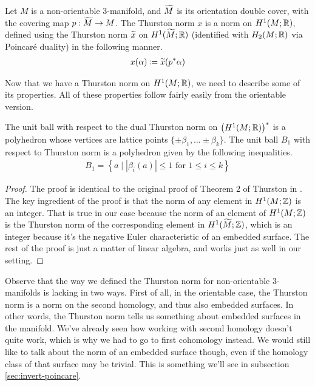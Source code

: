 \begin{defn}
  Let $M$ is a non-orientable $3$-manifold, and $\widetilde{M}$ is its orientation double cover, with the covering
  map $p: \widetilde{M} \to M$. The Thurston norm $x$ is a norm on $H^1(M; \mathbb{R})$, defined using the Thurston norm $\widetilde{x}$
  on $H^1(\widetilde{M}; \mathbb{R})$ (identified with $H_2(M; \mathbb{R})$ via Poincar\'e duality) in the following manner.
  \begin{align*}
    x(\alpha) \coloneqq \widetilde{x}(p^{\ast}\alpha)
  \end{align*}
\end{defn}
Now that we have a Thurston norm on $H^1(M; \mathbb{R})$, we need to describe some of its properties. All of these properties
follow fairly easily from the orientable version.
\begin{thm}
  The unit ball with respect to the dual Thurston norm on $\left( H^1(M; \mathbb{R}) \right)^{\ast}$ is a polyhedron
  whose vertices are lattice points $\{\pm \beta_1, \ldots \pm \beta_k\}$. The unit ball $B_1$ with respect to Thurston
  norm is a polyhedron given by the following inequalities.
  \begin{align*}
    B_1 = \left\{ a \mid \left| \beta_i(a) \right| \leq 1 \text{ for $1\leq i \leq k$} \right\}
  \end{align*}
\end{thm}

\begin{proof}
  The proof is identical to the original proof of Theorem $2$ of Thurston in
  \cite{thurston1986norm}. The key ingredient of the proof is that the norm of any element in
  $H^1(M; \mathbb{Z})$ is an integer. That is true in our case because the norm of an element of
  $H^1(M; \mathbb{Z})$ is the Thurston norm of the corresponding element in $H^1(\widetilde{M}; \mathbb{Z})$, which is an
  integer because it's the negative Euler characteristic of an embedded surface. The rest of the
  proof is just a matter of linear algebra, and works just as well in our setting.
\end{proof}

Observe that the way we defined the Thurston norm for non-orientable $3$-manifolds is lacking in two
ways. First of all, in the orientable case, the Thurston norm is a norm on the second homology, and
thus also embedded surfaces. In other words, the Thurston norm tells us something about embedded
surfaces in the manifold. We've already seen how working with second homology doesn't quite work,
which is why we had to go to first cohomology instead. We would still like to talk about the
norm of an embedded surface though, even if the homology class of that surface may be trivial.
This is something we'll see in subsection \ref{sec:invert-poincare}.

